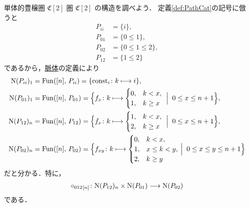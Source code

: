 \documentclass[TQFT_main]{subfiles}
\begin{document}
\begin{myexample}[label=ex:PathCat2]{単体的豊穣圏 {$\mathfrak{C}[2]$}}
    圏 \hyperref[def:PathCat]{$\mathfrak{C}[2]$} の構造を調べよう．
    定義\ref{def:PathCat}の記号に倣うと
    \begin{align}
        P_{ii} &= \{i\}, \\
        P_{01} &= \{0 \le 1\}, \\
        P_{02} &= \{0 \le 1 \le 2\}, \\
        P_{12} &= \{1 \le 2\}
    \end{align}
    であるから，\hyperref[def:nerve]{脈体}の定義により
    \begin{align}
        \mathrm{N}(P_{ii})_1 &= \mathrm{Fun}([n],\, P_{ii}) = \{\mathrm{const}_{i} \colon k \longmapsto i\}, \\
        \mathrm{N}(P_{01})_1 &= \mathrm{Fun}([n],\, P_{01}) = 
        \Bigl\{ 
            f_{x} \colon k \longmapsto
            \begin{cases}
                0, &k < x, \\
                1, &k \ge x
            \end{cases}\;
        \Bigm|\; 0 \le x \le n+1
        \Bigr\}, \\
        \mathrm{N}(P_{12})_n &= \mathrm{Fun}([n],\, P_{12}) = 
        \Bigl\{ 
            f_{x} \colon k \longmapsto
            \begin{cases}
                1, &k < x, \\
                2, &k \ge x
            \end{cases}\;
        \Bigm|\; 0 \le x \le n+1
        \Bigr\}, \\
        \mathrm{N}(P_{02})_n &= \mathrm{Fun}([n],\, P_{02}) = 
        \Bigl\{ 
            f_{xy} \colon k \longmapsto 
            \begin{cases}
                0, &k < x, \\
                1, &x \le k < y, \\
                2, &k \ge y
            \end{cases}
        \Bigm|\; 0 \le x \le y \le n+1
         \Bigr\} 
    \end{align}
    だと分かる．特に，
    \begin{align}
        \circ_{012}{}_{[n]} \colon \mathrm{N}(P_{12})_n \times \mathrm{N}(P_{01}) \longrightarrow \mathrm{N}(P_{02})
    \end{align}
    である．
\end{myexample}
\end{document}
